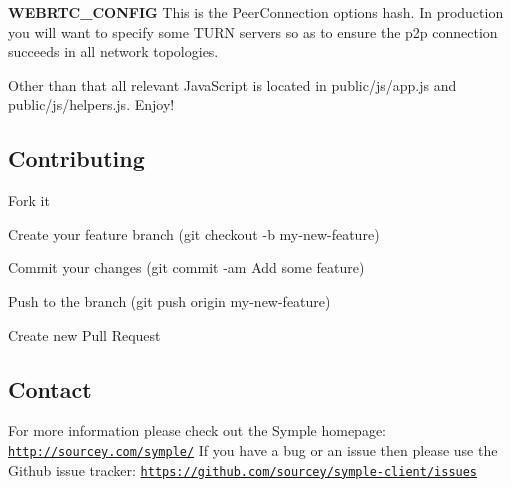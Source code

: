 {\bfseries W\+E\+B\+R\+T\+C\+\_\+\+C\+O\+N\+F\+IG} This is the Peer\+Connection options hash. In production you will want to specify some T\+U\+RN servers so as to ensure the p2p connection succeeds in all network topologies.

Other than that all relevant Java\+Script is located in {\ttfamily public/js/app.\+js} and {\ttfamily public/js/helpers.\+js}. Enjoy!

\subsection*{Contributing}


\begin{DoxyEnumerate}
\item Fork it
\item Create your feature branch ({\ttfamily git checkout -\/b my-\/new-\/feature})
\item Commit your changes ({\ttfamily git commit -\/am \textquotesingle{}Add some feature\textquotesingle{}})
\item Push to the branch ({\ttfamily git push origin my-\/new-\/feature})
\item Create new Pull Request
\end{DoxyEnumerate}

\subsection*{Contact}

For more information please check out the Symple homepage\+: \href{http://sourcey.com/symple/}{\tt http\+://sourcey.\+com/symple/} If you have a bug or an issue then please use the Github issue tracker\+: \href{https://github.com/sourcey/symple-client/issues}{\tt https\+://github.\+com/sourcey/symple-\/client/issues} 